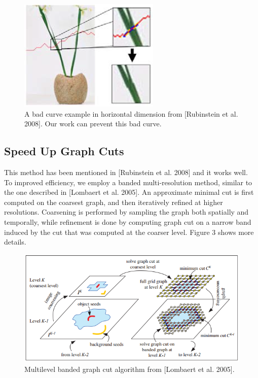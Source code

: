 \documentclass[a4paper, twocolumn]{article}
\begin{document}
			\begin{figure}
				\begin{center}
				\includegraphics[width=\linewidth]{Figure2.png}
				\caption{A bad curve example in horizontal dimension from [Rubinstein et al. 2008]. Our work can prevent this bad curve.}
				\end{center}
			\end{figure}
		
		\subsection{Speed Up Graph Cuts}
		This method has been mentioned in [Rubinstein et al. 2008] and it works well.\\
		\linebreak
		To improved efficiency, we employ a banded multi-resolution method, similar to the one described in [Lombaert et al. 2005]. An approximate minimal cut is first computed on the coarsest graph, and then iteratively refined at higher resolutions. Coarsening is performed by sampling the graph both spatially and temporally, while refinement is done by computing graph cut on a narrow band induced by the cut that was computed at the coarser level. Figure 3 shows more details.
		\begin{figure}
			\begin{center}
			\includegraphics[width=\linewidth]{Figure3.png}
			\caption{Multilevel banded graph cut algorithm from [Lombaert et al. 2005].}
			\end{center}
		\end{figure}
	
\end{document}
